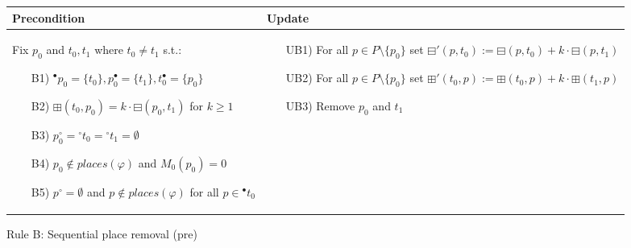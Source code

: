\begin{figure}[h]
    \begin{adjustbox}{center}
        \begin{tabular}{|p{70mm}|p{62mm}|} \hline
        Precondition & Update \\ \hline
        Fix $p_0$ and $t_0,t_1$ where $t_0\neq t_1$ s.t.:
        \begin{itemize}[leftmargin=10mm]
            \item[B1)] ${}^\bullet p_0=\{t_0\}, p_0^\bullet=\{t_1\},t_0^\bullet=\{p_0\}$
            \item[B2)] $\boxplus(t_0,p_0)=k\cdot\boxminus(p_0, t_1)$ for $k\geq 1$
            \item[B3)] $p_0^\circ ={}^\circ t_0={}^\circ t_1=\emptyset$
            \item[B4)] $p_0\notin places(\varphi)$ and $M_0(p_0)=0$
            \item[B5)] $p^\circ =\emptyset$ and $p\notin places(\varphi)$ for all $p\in{}^\bullet t_0$
        \end{itemize} &
        \begin{itemize}[leftmargin=10mm]
            \item[UB1)] For all $p\in P\setminus\{p_0\}$ set $\boxminus'(p,t_0):=\boxminus(p,t_0)+k\cdot\boxminus(p,t_1)$
            \item[UB2)] For all $p\in P\setminus\{p_0\}$ set $\boxplus'(t_0,p):=\boxplus(t_0,p)+k\cdot\boxplus(t_1,p)$
            \item[UB3)] Remove $p_0$ and $t_1$
        \end{itemize} \\ \hline
        \end{tabular}
    \end{adjustbox}
    \caption{Rule B: Sequential place removal (pre)}
    \label{fig:rule_b_pre}
\end{figure}

